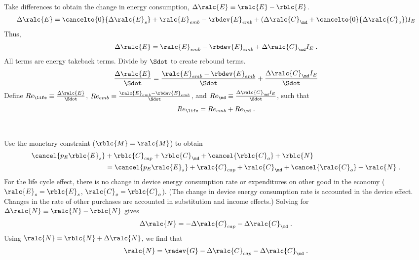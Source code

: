 \begin{landscape}
{Take differences to obtain the change in energy consumption, $\Delta \ralc{E} \equiv \ralc{E} - \rblc{E}$.
%
\begin{equation}
  \Delta \ralc{E} = \cancelto{0}{\Delta \ralc{E}_s}
                    + \ralc{E}_{emb} - \rbdev{E}_{emb}
                    + (\Delta \ralc{C}_{\md} + \cancelto{0}{\Delta \ralc{C}_o}) I_E
\end{equation}
%
Thus, 
%
\begin{equation}
  \Delta \ralc{E} = \ralc{E}_{emb} - \rbdev{E}_{emb} + \Delta \ralc{C}_{\md} I_E \; .
\end{equation}
%
All terms are energy takeback terms.
Divide by $\Sdot$
to create rebound terms.
%
\begin{equation}
  \frac{\Delta \ralc{E}}{\Sdot} = \frac{\ralc{E}_{emb} - \rbdev{E}_{emb}}{\Sdot} + \frac{\Delta \ralc{C}_{\md} I_E}{\Sdot}
\end{equation}
%
Define
$Re_{\life} \equiv \frac{\Delta \ralc{E}}{\Sdot}$, 
$Re_{emb} \equiv \frac{\ralc{E}_{emb} - \rbdev{E}_{emb}}{\Sdot}$, and
$Re_{\md} \equiv \frac{\Delta \ralc{C}_{\md} I_E}{\Sdot}$,
such that
%
\begin{equation} \label{eq:Re_lc_def}
  Re_{\life} = Re_{emb} + Re_{\md} \; .
\end{equation}
%
}
{
~

Use the monetary constraint ($\rblc{M} = \ralc{M}$) to obtain
%
\begin{align} \label{M_dot_bal_lc}
  \cancel{p_E \rblc{E}_s} &+ \rblc{C}_{cap} + \rblc{C}_{\md} + \cancel{\rblc{C}_o} + \rblc{N} \nonumber \\
                          &= \cancel{p_E \ralc{E}_s} + \ralc{C}_{cap} + \ralc{C}_{\md} + \cancel{\ralc{C}_o}  + \ralc{N} \; .
\end{align}
%
For the life cycle effect, 
there is no change in device energy consumption rate or expenditures on other good in the economy 
($\ralc{E}_s = \rblc{E}_s$, $\ralc{C}_o = \rblc{C}_o$).
(The change in device energy consumption rate is accounted in the device effect.
Changes in the rate of other purchases are accounted in substitution and income effects.)
Solving for $\Delta \ralc{N} \equiv \ralc{N} - \rblc{N}$ gives
%
\begin{equation}
  \Delta \ralc{N} = - \Delta \ralc{C}_{cap} - \Delta \ralc{C}_{\md} \; .
\end{equation}
%
Using $\ralc{N} = \rblc{N} + \Delta \ralc{N}$, we find that
%
\begin{equation}
  \ralc{N} = \radev{G} - \Delta \ralc{C}_{cap} - \Delta \ralc{C}_{\md} \; .
\end{equation}
%
}

\end{landscape}

